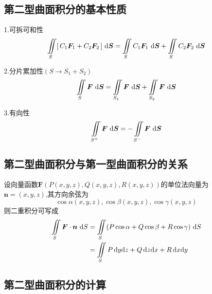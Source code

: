 \subsection{第二型曲面积分的基本性质}
\ttheorem[第二型曲面积分的三个基本性质]
1.可拆可和性
\begin{equation}
\iint\limits_{S}[\,C_1\bm{F}_1+C_2\bm{F}_2\,]\,\,{\rm{d}} \bm{S} =\iint\limits_{S}C_1\bm{F}_1\,\,{\rm{d}} \bm{S}  + \iint\limits_{S}C_2\bm{F}_2\,\,{\rm{d}} \bm{S} 
\end{equation}

\par 2.分片累加性$(S\rightarrow S_1+S_2)$
\begin{equation}
\iint\limits_{S}\bm{F}\,\,{\rm{d}} \bm{S}  = \iint\limits_{S_1}\bm{F}\,\,{\rm{d}} \bm{S}  +\iint\limits_{S_2}\bm{F}\,\,{\rm{d}} \bm{S} 
\end{equation}

\par 3.有向性
\begin{equation}
\iint\limits_{S^+}\bm{F}\,\,{\rm{d}} \bm{S} = -\iint\limits_{S^-}\bm{F}\,\,{\rm{d}} \bm{S} 
\end{equation}

\subsection{第二型曲面积分与第一型曲面积分的关系}
\ttheorem[第二型曲面积分与第一型曲面积分的关系]
设向量函数$\bm{F}(P(x,y,z),Q(x,y,z),R(x,y,z))$的单位法向量为$\bm{n}=(x,y,z)$,其方向余弦为
\[
\cos \alpha (x,y,z),\cos \beta (x,y,z),\cos \gamma(x,y,z)
\]
则二重积分可写成
\begin{equation}
\begin{split}
\iint\limits_{S}\bm{F}\cdot \bm{n}\,\,{\rm{d}} S&=\iint\limits_{S}(P\cos \alpha +Q\cos \beta +R\cos \gamma )\,\,{\rm{d}} S\\
&=\iint\limits_{S}P \,{\rm{d}} y{\rm{d}} z+Q\,{\rm{d}} z{\rm{d}} x+R\,{\rm{d}} x{\rm{d}} y
\end{split}
\end{equation}

\subsection{第二型曲面积分的计算}
\begin{table}[h]
	\centering
	\renewcommand{\arraystretch}{1.6}
	\caption{不同的曲面方程的方向余弦}
	\renewcommand{\arraystretch}{1}
	\label{方向余弦}
\end{table} 

